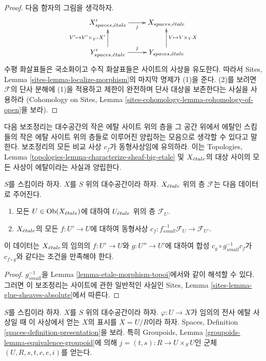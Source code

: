 \begin{proof}
다음 함자의 그림을 생각하자.
$$
\xymatrix{
X'_{spaces, \etale} \ar[r]_j &
X_{spaces, \etale} \\
Y'_{spaces, \etale} \ar[r]^j \ar[u]^{V' \mapsto V' \times_{Y'} X'} &
Y_{spaces, \etale} \ar[u]_{V \mapsto V \times_Y X}
}
$$
수평 화살표들은 국소화이고 수직 화살표들은 사이트의 사상을 유도한다.
따라서 Sites, Lemma \ref{sites-lemma-localize-morphism}의 마지막
명제가 (1)을 준다. (2)를 보려면 $\mathcal{F}$의 단사 분해에
(1)을 적용하고 제한이 완전하며 단사 대상을 보존한다는 사실을 사용하라
(Cohomology on Sites, Lemma
\ref{sites-cohomology-lemma-cohomology-of-open}을 보라).
\end{proof}

\noindent
다음 보조정리는 대수공간의 작은 에탈 사이트 위의 층을 그 공간 위에서
에탈인 스킴들의 작은 에탈 사이트 위의 층들로 이루어진 양립하는
모음으로 생각할 수 있다고 말한다. 보조정리의 모든 비교 사상
$c_f$가 동형사상임에 유의하라. 이는 Topologies, Lemma
\ref{topologies-lemma-characterize-sheaf-big-etale} 및
$X_{\acute{e}tale}$의 대상 사이의 모든 사상이 에탈이라는 사실과 양립한다.

\begin{lemma}
\label{lemma-characterize-sheaf-small-etale}
$S$를 스킴이라 하자. $X$를 $S$ 위의 대수공간이라 하자.
$X_{\acute{e}tale}$ 위의 층 $\mathcal{F}$는 다음 데이터로 주어진다.
\begin{enumerate}
\item 모든 $U \in \mathop{\mathrm{Ob}}\nolimits(X_{\acute{e}tale})$에 대하여 $U_{\acute{e}tale}$ 위의 층
$\mathcal{F}_U$.
\item $X_{\acute{e}tale}$의 모든 $f : U' \to U$에 대하여 동형사상
$c_f : f_{small}^{-1}\mathcal{F}_U \to \mathcal{F}_{U'}$.
\end{enumerate}
이 데이터는 $X_{\acute{e}tale}$의 임의의 $f : U' \to U$와
$g : U'' \to U'$에 대하여 합성
$c_g \circ g_{small}^{-1} c_f$가 $c_{f \circ g}$와 같다는 조건을
만족해야 한다.
\end{lemma}

\begin{proof}
$g_{small}^{-1}$을 Lemma \ref{lemma-etale-morphism-topoi}에서와 같이
해석할 수 있다. 그러면 이 보조정리는 사이트에 관한 일반적인 사실인
Sites, Lemma \ref{sites-lemma-glue-sheaves-absolute}에서 따른다.
\end{proof}

\noindent
$S$를 스킴이라 하자. $X$를 $S$ 위의 대수공간이라 하자.
$\varphi : U \to X$가 임의의 전사 에탈 사상일 때 이 사상에서 얻는
$X$의 표시를 $X = U/R$이라 하자. Spaces, Definition
\ref{spaces-definition-presentation}을 보라.
특히 Groupoids, Lemma
\ref{groupoids-lemma-equivalence-groupoid}에 의해
$j = (t, s) : R \to U \times_S U$인 군체
$(U, R, s, t, c, e, i)$를 얻는다.

